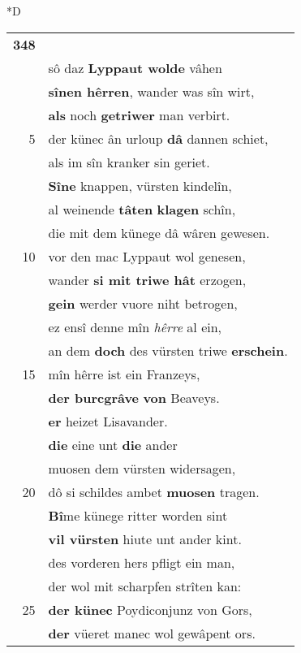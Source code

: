 \documentclass[8pt,a4paper,notitlepage]{article}
\begin{document}
\begin{table}[ht]
\begin{minipage}[t]{0.5\linewidth}
\small
\begin{center}*D
\end{center}
\begin{tabular}{rl}
\textbf{348} & \textbf{\begin{large}M\end{large}an kunde dâ} niht gâhen,\\ 
 & sô daz \textbf{Lyppaut wolde} vâhen\\ 
 & \textbf{sînen hêrren}, wander was sîn wirt,\\ 
 & \textbf{als} noch \textbf{getriwer} man verbirt.\\ 
5 & der künec ân urloup \textbf{dâ} dannen schiet,\\ 
 & als im sîn kranker sin geriet.\\ 
 & \textbf{Sîne} knappen, vürsten kindelîn,\\ 
 & al weinende \textbf{tâten} \textbf{klagen} schîn,\\ 
 & die mit dem künege dâ wâren gewesen.\\ 
10 & vor den mac Lyppaut wol genesen,\\ 
 & wander \textbf{si mit triwe hât} erzogen,\\ 
 & \textbf{gein} werder vuore niht betrogen,\\ 
 & ez ensî denne mîn \textit{hêrre} al ein,\\ 
 & an dem \textbf{doch} des vürsten triwe \textbf{erschein}.\\ 
15 & mîn hêrre ist ein Franzeys,\\ 
 & \textbf{der burcgrâve} \textbf{von} Beaveys.\\ 
 & \textbf{er} heizet Lisavander.\\ 
 & \textbf{die} eine unt \textbf{die} ander\\ 
 & muosen dem vürsten widersagen,\\ 
20 & dô si schildes ambet \textbf{muosen} tragen.\\ 
 & \textbf{Bî}me künege ritter worden sint\\ 
 & \textbf{vil vürsten} hiute unt ander kint.\\ 
 & des vorderen hers pfligt ein man,\\ 
 & der wol mit scharpfen strîten kan:\\ 
25 & \textbf{der künec} Poydiconjunz von Gors,\\ 
 & \textbf{der} vüeret manec wol gewâpent ors.\\ 

\end{tabular}
\end{minipage}
\end{table}
\end{document}
